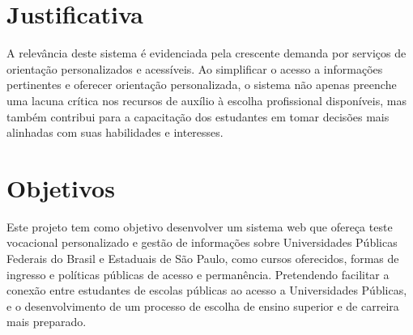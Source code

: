 

\section{Justificativa}

A relevância deste sistema é evidenciada pela crescente demanda por serviços de orientação personalizados e acessíveis. Ao simplificar o acesso a informações pertinentes e oferecer orientação personalizada, o sistema não apenas preenche uma lacuna crítica nos recursos de auxílio à escolha profissional disponíveis, mas também contribui para a capacitação dos estudantes em tomar decisões mais alinhadas com suas habilidades e interesses.

\section{Objetivos}

Este projeto tem como objetivo desenvolver um sistema web que ofereça teste vocacional personalizado e gestão de informações sobre Universidades Públicas Federais do Brasil e Estaduais de São Paulo, como cursos oferecidos, formas de ingresso e políticas públicas de acesso e permanência. Pretendendo facilitar a conexão entre estudantes de escolas públicas ao acesso a Universidades Públicas, e o desenvolvimento de  um processo de escolha de ensino superior e de carreira mais preparado.


